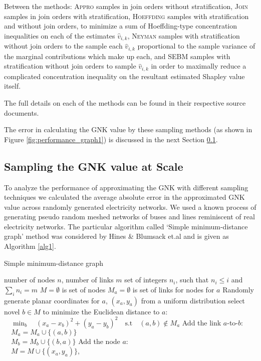 Between the methods: \textsc{Appro} samples in join orders without stratification, \textsc{Join} samples in join orders with stratification, \textsc{Hoeffding} samples with stratification and without join orders, to minimize a sum of Hoeffding-type concentration inequalities on each of the estimates $\hat{v}_{i,k}$,
\textsc{Neyman} samples with stratification without join orders to the sample each $\hat{v}_{i,k}$ proportional to the sample variance of the marginal contributions which make up each,
and \textsc{SEBM} samples with stratification without join orders to sample $\hat{v}_{i,k}$ in order to maximally reduce a complicated concentration inequality on the resultant estimated Shapley value itself.

The full details on each of the methods can be found in their respective source documents.\cite{CASTRO2017180,2013arXiv1306.4265M,burgess2,DBLP:journals/cor/CastroGT09}

The error in calculating the GNK value by these sampling methods (as shown in Figure \ref{fig:performance_graph1}) is discussed in the next Section \ref{section:performance}.

\subsection{Sampling the GNK value at Scale}\label{section:performance}

To analyze the performance of approximating the GNK with different sampling techniques we calculated the average absolute error in the approximated GNK value across randomly generated electricity networks.
We used a known process of generating pseudo random meshed networks of buses and lines reminiscent of real electricity networks. The particular algorithm called `Simple minimum-distance graph' method was considered by Hines \& Blumsack et.al \cite{hines1} and is given as Algorithm \ref{alg1}.

\begin{algorithm}[]
\caption{Simple minimum-distance graph}
\label{alg1}
\begin{algorithmic}
    \REQUIRE number of nodes $n$, number of links $m$
    \REQUIRE set of integers $n_i$, such that $n_i\leq i$ and $\sum_in_i=m$
    \STATE $M=\emptyset$ is set of nodes
    \STATE $M_a=\emptyset$ is set of links for nodes for $a$
        \STATE Randomly generate planar coordinates for $a$, $(x_a ,y_a)$ from a uniform distribution
            \STATE select novel $b\in M$ to minimize the Euclidean distance to $a$:\\ $\quad\min_b\quad (x_a-x_b)^2+(y_a-y_b)^2\quad\text{s.t}\quad (a, b)\notin M_a$
            \STATE Add the link $a$-to-$b$:\\ $\quad M_a=M_a\cup \{(a, b)\}$\\ $\quad M_b=M_b\cup \{(b, a)\}$
        \ENDFOR
        \STATE Add the node $a$:\\ $\quad M=M\cup \{(x_a ,y_a)\}$, 
    \ENDFOR
\end{algorithmic}
\end{algorithm}


